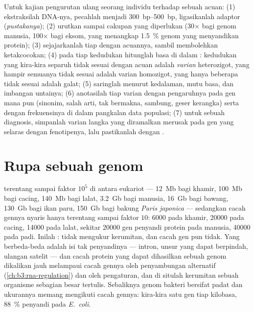\begin{method}\label{met:b3:genomics:pipeline}
Untuk kajian pengurutan ulang seorang individu terhadap sebuah acuan: (1)
ekstraksilah DNA-nya, pecahlah menjadi \qtyrange{300}{500}{bp}, ligasikanlah
adaptor (\emph{pustakanya}); (2) urutkan sampai cakupan yang diperlukan
(30$\times$ bagi genom manusia, 100$\times$ bagi eksom, yang menangkap
\qty{1.5}{\%} genom yang menyandikan protein); (3) sejajarkanlah tiap
 dengan acuannya, sambil membolehkan ketakcocokan; (4) pada tiap
kedudukan hitunglah basa di dalam : kedudukan yang kira-kira separuh
 tidak sesuai dengan acuan adalah \emph{varian} heterozigot, yang
hampir semuanya tidak sesuai adalah varian homozigot, yang hanya beberapa
tidak sesuai adalah galat; (5) saringlah menurut kedalaman, mutu basa, dan
imbangan untainya; (6) anotasilah tiap varian dengan pengaruhnya pada gen mana
pun (sinonim, salah arti, tak bermakna, sambung, geser kerangka) serta dengan
frekuensinya di dalam pangkalan data populasi; (7) untuk sebuah diagnosis,
simpanlah varian langka yang diramalkan merusak pada gen yang selaras dengan
fenotipenya, lalu pastikanlah dengan .
\end{method}

\section{Rupa sebuah genom}

\begin{proposition}\label{prop:b3:genomics:sizes}
 terentang sampai faktor $10^{5}$ di antara eukariot ---
\qty{12}{Mb} bagi khamir, \qty{100}{Mb} bagi cacing, \qty{140}{Mb} bagi
lalat, \qty{3.2}{Gb} bagi manusia, \qty{16}{Gb} bagi bawang,
\qty{130}{Gb} bagi ikan paru, \qty{150}{Gb} bagi bakung \emph{Paris
japonica} --- sedangkan cacah gennya nyaris hanya terentang sampai faktor
$10$: \num{6000} pada khamir, \num{20000} pada cacing, \num{14000} pada lalat,
sekitar \num{20000} gen penyandi protein pada manusia, \num{40000} pada padi.
Inilah \emph{}:  tidak mengukur
kerumitan, dan cacah gen pun tidak. Yang berbeda-beda adalah isi tak
penyandinya --- intron, unsur yang dapat berpindah, ulangan satelit --- dan
cacah protein yang dapat dihasilkan sebuah genom dikalikan jauh melampaui
cacah gennya oleh penyambungan alternatif (\cref{ch:b3:rna-regulation})
dan oleh pengaturan, dan di situlah kerumitan sebuah organisme sebagian besar
tertulis. Sebaliknya genom bakteri bersifat padat dan ukurannya memang
mengikuti cacah gennya: kira-kira satu gen tiap kilobasa, \qty{88}{\%}
penyandi pada \emph{E.~coli}.
\end{proposition}

